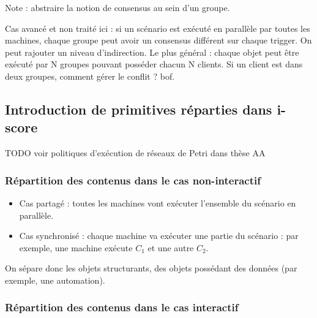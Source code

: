 \documentclass{article}
\begin{document}
Note : abstraire la notion de consensus au sein d'un groupe.

Cas avancé et non traité ici : si un scénario est exécuté en parallèle par toutes les machines, chaque groupe peut avoir un consensus différent sur chaque trigger.
On peut rajouter un niveau d'indirection. Le plus général : chaque objet peut être exécuté par N groupes pouvant posséder chacun N clients.
Si un client est dans deux groupes, comment gérer le conflit ? bof.

\subsection{Introduction de primitives réparties dans i-score}
TODO voir politiques d'exécution de réseaux de Petri dans thèse AA

\subsubsection{Répartition des contenus dans le cas non-interactif}
\begin{figure}[h]
    \centering
    \begin{tikzpicture}
    
    \end{tikzpicture}
    \label{scenar.simple}
\end{figure}

\begin{itemize}
    \item Cas partagé : toutes les machines vont exécuter l'ensemble du scénario en parallèle.
    \item Cas synchronisé : chaque machine va exécuter une partie du scénario : par exemple, une machine exécute $C_1$ et une autre $C_2$.
\end{itemize}

On sépare donc les objets structurants, des objets possédant des données (par exemple, une automation).


\subsubsection{Répartition des contenus dans le cas interactif}
\begin{figure}[h]
    \centering
    \begin{tikzpicture}
    
    \end{tikzpicture}
    \label{scenar.general}
\end{figure}
\end{document}
